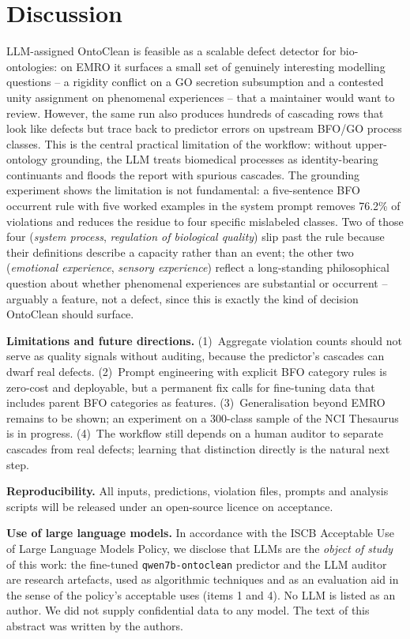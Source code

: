 \documentclass[10pt,a4paper]{article}
\begin{document}
\section{Discussion}
LLM-assigned OntoClean is feasible as a scalable defect detector for
bio-ontologies: on EMRO it surfaces a small set of genuinely
interesting modelling questions -- a rigidity conflict on a GO
secretion subsumption and a contested unity assignment on phenomenal
experiences -- that a maintainer would want to review. However, the
same run also produces hundreds of cascading rows that look like
defects but trace back to predictor errors on upstream BFO/GO process
classes. This is the central practical limitation of the workflow:
without upper-ontology grounding, the LLM treats biomedical processes
as identity-bearing continuants and floods the report with spurious
cascades. The grounding experiment shows the limitation is not
fundamental: a five-sentence BFO occurrent rule with five worked
examples in the system prompt removes 76.2\% of violations and reduces
the residue to four specific mislabeled classes. Two of those four
(\emph{system process}, \emph{regulation of biological quality}) slip
past the rule because their definitions describe a capacity rather
than an event; the other two (\emph{emotional experience},
\emph{sensory experience}) reflect a long-standing philosophical
question about whether phenomenal experiences are substantial or
occurrent -- arguably a feature, not a defect, since this is exactly
the kind of decision OntoClean should surface.

\textbf{Limitations and future directions.} (1)~Aggregate violation
counts should not serve as quality signals without auditing, because
the predictor's cascades can dwarf real defects. (2)~Prompt
engineering with explicit BFO category rules is zero-cost and
deployable, but a permanent fix calls for fine-tuning data that
includes parent BFO categories as features. (3)~Generalisation beyond
EMRO remains to be shown; an experiment on a 300-class sample of the
NCI Thesaurus is in progress. (4)~The workflow still depends on a
human auditor to separate cascades from real defects; learning that
distinction directly is the natural next step.

\textbf{Reproducibility.} All inputs, predictions, violation files,
prompts and analysis scripts will be released under an open-source
licence on acceptance.

\textbf{Use of large language models.} In accordance with the ISCB
Acceptable Use of Large Language Models Policy, we disclose that LLMs
are the \emph{object of study} of this work: the fine-tuned
\texttt{qwen7b-ontoclean} predictor and the LLM auditor are research
artefacts, used as algorithmic techniques and as an evaluation aid in
the sense of the policy's acceptable uses (items 1 and 4). No LLM is
listed as an author. We did not supply confidential data to any model.
The text of this abstract was written by the authors.
\end{document}
